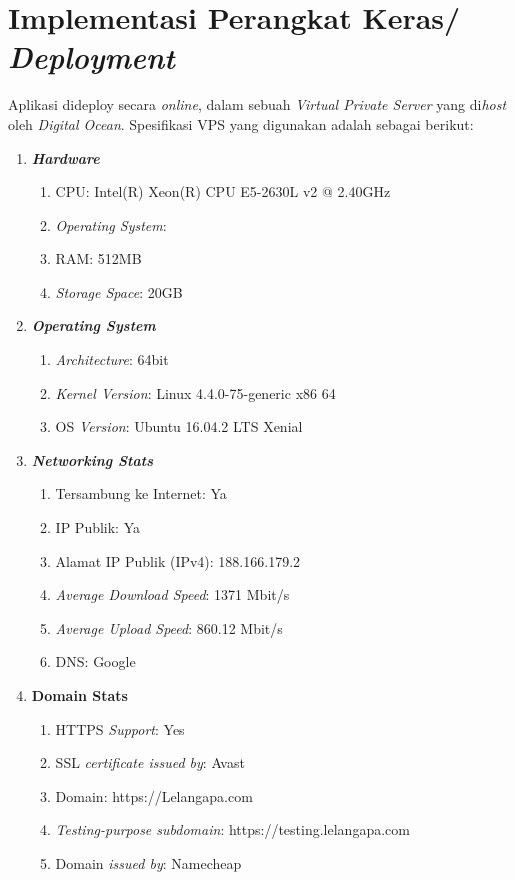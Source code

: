   \section{Implementasi Perangkat Keras/ \textit{Deployment}}
  
  Aplikasi dideploy secara \textit{online}, dalam sebuah \textit{Virtual Private Server} yang di\textit{host} oleh \textit{Digital Ocean}.
  Spesifikasi VPS yang digunakan adalah sebagai berikut:
  
  \begin{enumerate}
  	\item \textbf{\textit{Hardware}}
  	\begin{enumerate}
  		\item CPU: Intel(R) Xeon(R) CPU E5-2630L v2 @ 2.40GHz
  		\item \textit{Operating System}: 
  		\item RAM: 512MB
  		\item \textit{Storage Space}: 20GB
  	\end{enumerate}
  	
  	\item \textbf{\textit{Operating System}}
  	\begin{enumerate}
  		\item \textit{Architecture}: 64bit
  		\item \textit{Kernel Version}: Linux 4.4.0-75-generic x86 64
  		\item OS \textit{Version}: Ubuntu 16.04.2 LTS Xenial
  	\end{enumerate}
  	
  	\item \textit{\textbf{Networking Stats}}
  	\begin{enumerate}
  		\item Tersambung ke Internet: Ya
  		\item IP Publik: Ya
  		\item Alamat IP Publik (IPv4): 188.166.179.2
  		\item \textit{Average Download Speed}: 1371 Mbit/s
  		\item \textit{Average Upload Speed}: 860.12 Mbit/s
  		\item DNS: Google
  	\end{enumerate}
  	
  	\item \textbf{\textbf{Domain Stats}}
  	\begin{enumerate}
  		\item HTTPS \textit{Support}: Yes
  		\item SSL \textit{certificate issued by}: Avast
  		\item Domain: https://Lelangapa.com
  		\item \textit{Testing-purpose subdomain}: https://testing.lelangapa.com
  		\item Domain \textit{issued by}: Namecheap
  	\end{enumerate}
  	
  \end{enumerate}
  
